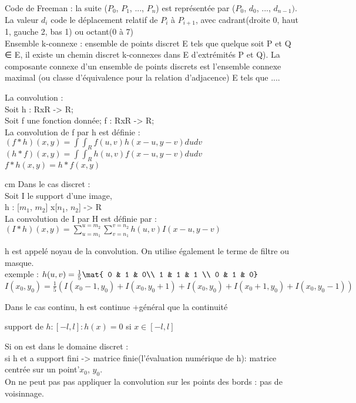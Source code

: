 \documentclass[11pt]{article}
\begin{document}
Code de Freeman : la suite ($P_0$, $P_1$, ..., $P_n$) est représentée par ($P_0$, $d_0$, ..., $d_{n-1}).$ La valeur $d_i$ code le déplacement relatif de $P_i$ à $P_{i+1}$, avec cadrant(droite 0, haut 1, gauche 2, bas 1) ou octant(0 à 7)\\

Ensemble k-connexe : ensemble de points discret E tels que quelque soit P et Q ∈ E, il existe un chemin discret k-connexes dans E d'extrémités P et Q). La composante connexe d'un ensemble de points discrets est l'ensemble connexe maximal (ou classe d'équivalence pour la relation d'adjacence) E tels que ....
\vskip 1cm

La convolution : \\
Soit h : RxR -> R;\\
Soit f une fonction donnée; f : RxR -> R;\\
La convolution de f par h est définie : \\
$(f * h)(x, y) = \int \int_R f(u, v)h(x-u, y - v) dudv$\\
$(h * f)(x, y) = \int \int_R h(u,v)f(x - u, y -v ) du dv$\\
$f * h(x, y) = h * f(x, y)$

 cm
Dans le cas discret :\\
Soit I le support d'une image, \\
h : [$m_1$, $m_2$] x[$n_1$, $n_2$] -> R\\

La convolution de I par H est définie par :\\
$(I * h)(x, y) = \sum^{u=m_2}_{u=m_1}\sum^{v=n_2}_{v=n_1} h(u, v)I(x- u, y-v)$

h est appelé noyau de la convolution. On utilise également le terme de filtre ou masque.\\


exemple :
$h(u, v) = \frac{1}{5}\mat { 0 & 1 & 0\\ 1 & 1 & 1 \\ 0 & 1 & 0}$\\
$I(x_0, y_0) = \frac{1}{5}(
I(x_0 -1, y_0) + I(x_0, y_0+1) + I(x_0, y_0) + I(x_0 +1, y_0) + I(x_0, y_0 -1))$

Dans le cas continu, h est continue {+général que la continuité}

support de $h : [-l, l] : h(x) = 0$ si $x \in [-l, l]$

\vskip 1cm

Si on est dans le domaine discret :\\
si h et a support fini -> matrice finie(l'évaluation numérique de h): matrice centrée sur un point'$x_0$, $y_0$.\\
On ne peut pas pas appliquer la convolution sur les points des bords : pas de voisinnage.
\end{document}
